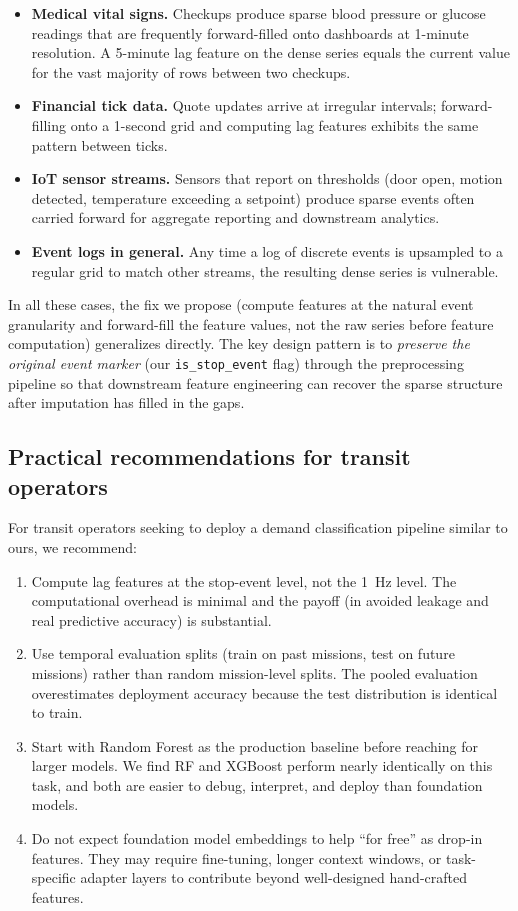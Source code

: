 \begin{itemize}
  \item \textbf{Medical vital signs.} Checkups produce sparse blood pressure
    or glucose readings that are frequently forward-filled onto dashboards
    at 1-minute resolution. A 5-minute lag feature on the dense series
    equals the current value for the vast majority of rows between two
    checkups.
  \item \textbf{Financial tick data.} Quote updates arrive at irregular
    intervals; forward-filling onto a 1-second grid and computing lag
    features exhibits the same pattern between ticks.
  \item \textbf{IoT sensor streams.} Sensors that report on thresholds
    (door open, motion detected, temperature exceeding a setpoint) produce
    sparse events often carried forward for aggregate reporting and
    downstream analytics.
  \item \textbf{Event logs in general.} Any time a log of discrete events
    is upsampled to a regular grid to match other streams, the resulting
    dense series is vulnerable.
\end{itemize}

In all these cases, the fix we propose (compute features at the natural
event granularity and forward-fill the feature values, not the raw series
before feature computation) generalizes directly. The key design pattern
is to \emph{preserve the original event marker} (our
\texttt{is\_stop\_event} flag) through the preprocessing pipeline so that
downstream feature engineering can recover the sparse structure after
imputation has filled in the gaps.

\subsection{Practical recommendations for transit operators}

For transit operators seeking to deploy a demand classification pipeline
similar to ours, we recommend:
\begin{enumerate}
  \item Compute lag features at the stop-event level, not the 1~Hz level.
    The computational overhead is minimal and the payoff (in avoided
    leakage and real predictive accuracy) is substantial.
  \item Use temporal evaluation splits (train on past missions, test on
    future missions) rather than random mission-level splits. The pooled
    evaluation overestimates deployment accuracy because the test
    distribution is identical to train.
  \item Start with Random Forest as the production baseline before
    reaching for larger models. We find RF and XGBoost perform nearly
    identically on this task, and both are easier to debug, interpret,
    and deploy than foundation models.
  \item Do not expect foundation model embeddings to help ``for free''
    as drop-in features. They may require fine-tuning, longer context
    windows, or task-specific adapter layers to contribute beyond
    well-designed hand-crafted features.
\end{enumerate}

